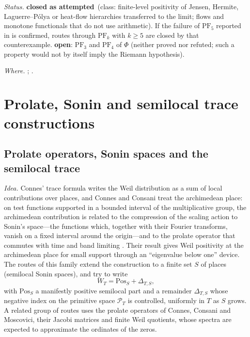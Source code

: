 \documentclass[11pt]{amsart}
\theoremstyle{definition}
\theoremstyle{remark}
\numberwithin{equation}{section}
\newcommand{\PT}{\mathcal{P}_T}                        %
\newcommand{\WT}{W_T}                                  %
\newcommand{\rtag}[1]{\textbf{\small\textsf{#1}}}
\newcommand{\closedA}{\rtag{closed as attempted}}
\newcommand{\openR}{\rtag{open}}
\newcommand{\entry}[1]{\par\smallskip\noindent\textit{#1.}\enspace}
\begin{document}
\entry{Status} \closedA\ (class: finite-level positivity of Jensen, Hermite, Laguerre--P\'olya or
heat-flow hierarchies transferred to the limit; flows and monotone functionals that do not use
arithmetic). If the failure of $\mathrm{PF}_5$ reported in \cite{Michalowski2026} is confirmed, routes through $\mathrm{PF}_k$
with $k\ge5$ are closed by that counterexample. \openR: $\mathrm{PF}_3$ and $\mathrm{PF}_4$ of $\Phi$
(neither proved nor refuted; such a property would not by itself imply the Riemann hypothesis).

\entry{Where} \cite{P13,P14,P15}; \cite{Polya1927,deBruijn1950,Newman1976,RodgersTao2020,GORZ2019,
Schoenberg1951,BorceaBranden2009,MSS2015,Michalowski2026}.


\section{Prolate, Sonin and semilocal trace constructions}\label{w6:sec:prolate}

\subsection{Prolate operators, Sonin spaces and the semilocal trace}\label{w6:fam:R15}

\entry{Idea} Connes' trace formula \cite{Connes1999} writes the Weil distribution as a sum of local
contributions over places, and Connes and Consani \cite{ConnesConsani2021} treat the archimedean
place: on test functions supported in a bounded interval of the multiplicative group, the
archimedean contribution is related to the compression of the scaling action to Sonin's space---the
functions which, together with their Fourier transforms, vanish on a fixed interval around the
origin---and to the prolate operator that commutes with time and band limiting
\cite{SlepianPollak1961}. Their result gives Weil positivity at the archimedean place for small
support through an ``eigenvalue below one'' device. The routes of this family extend the
construction to a finite set $S$ of places (semilocal Sonin spaces), and try to write
\[
\WT=\mathrm{Pos}_{S}+\Delta_{T,S},
\]
with $\mathrm{Pos}_S$ a manifestly positive semilocal part and a remainder $\Delta_{T,S}$ whose
negative index on the primitive space $\PT$ is controlled, uniformly in $T$ as $S$ grows. A related
group of routes uses the prolate operators of Connes, Consani and Moscovici, their Jacobi matrices
and finite Weil quotients, whose spectra are expected to approximate the ordinates of the zeros.
\end{document}
